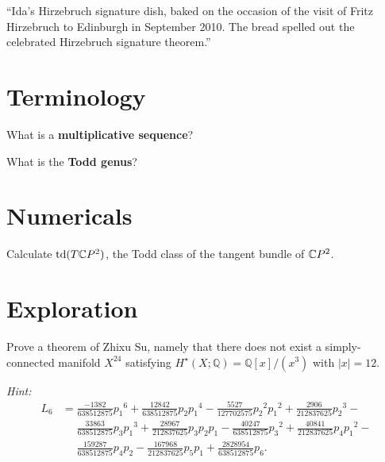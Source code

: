 \documentclass{homework}
\author{Jim Fowler}
\newcommand{\Q}{\mathbb{Q}}
\begin{document}
\maketitle

\begin{inspiration}
  ``Ida's Hirzebruch signature dish, baked on the occasion of the
  visit of Fritz Hirzebruch to Edinburgh in September 2010. The bread
  spelled out the celebrated Hirzebruch signature theorem.''
\end{inspiration}

\section{Terminology}

\begin{problem}
  What is a \textbf{multiplicative sequence}?
\end{problem}


\begin{problem}
  What is the \textbf{Todd genus}?
\end{problem}

\section{Numericals}

\begin{problem}
  Calculate $\mathrm{td}(T\mathbb{C}P^2)$, the Todd class of the tangent bundle of $\mathbb{C}P^2$.
\end{problem}

\section{Exploration}

\begin{problem}
  Prove a theorem of Zhixu Su, namely that there does not exist a
  simply-connected manifold $X^{24}$ satisfying
  $H^\star(X; \Q) = \Q[x]/(x^3)$ with $|x| = 12$.

  \textit{Hint:}
  \begin{align*}
    L_6 &= \frac{-1382}{638512875} {p_1}^6 + \frac{12842}{638512875} p_2{p_1}^4 - 
         \frac{5527}{127702575} {p_2}^2 {p_1}^2 + \frac{2906}{212837625} {p_2}^3 - \\
        &\phantom{=} \frac{33863}{638512875} p_3 {p_1}^3 + \frac{28967}{212837625} p_3p_2 p_1 - 
         \frac{40247}{638512875} {p_3}^2 + \frac{40841}{212837625} p_4{p_1}^2 - \\
        &\phantom{=} \frac{159287}{638512875} p_4 p_2 - \frac{167968}{212837625} p_5 p_1 + 
         \frac{2828954}{638512875} p_6.
  \end{align*}  
\end{problem}
\end{document}
